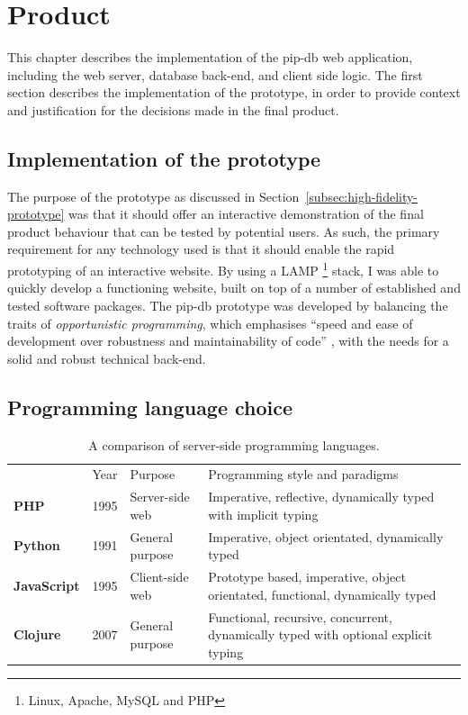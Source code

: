 \chapter{Product}\label{chap:product}
This chapter describes the implementation of the pip-db web
application, including the web server, database back-end, and client
side logic. The first section describes the implementation of the
prototype, in order to provide context and justification for the
decisions made in the final product.


\section{Implementation of the prototype}\label{sec:prototype-implementation}

The purpose of the prototype as discussed in
Section~\ref{subsec:high-fidelity-prototype} was that it should offer
an interactive demonstration of the final product behaviour that can
be tested by potential users. As such, the primary requirement for any
technology used is that it should enable the rapid prototyping of an
interactive website. By using a LAMP \footnote{Linux, Apache, MySQL
  and PHP} stack, I was able to quickly develop a functioning website,
built on top of a number of established and tested software
packages. The pip-db prototype was developed by balancing the traits
of \textit{opportunistic programming}, which emphasises ``speed and
ease of development over robustness and maintainability of code''
\cite{brandt2008opportunistic}, with the needs for a solid and robust
technical back-end.

\section{Programming language choice}\label{sec:programming-language-choice}

\cite{gabriel1991rise}

\begin{table}[H]
\centering
\begin{tabular}{l c p{3cm} p{8cm}}
                      & Year & Purpose         & Programming style and paradigms\\
  \textbf{PHP}        & 1995 & Server-side web & Imperative, reflective, dynamically typed with implicit typing\\
  \textbf{Python}     & 1991 & General purpose & Imperative, object orientated, dynamically typed\\
  \textbf{JavaScript} & 1995 & Client-side web & Prototype based, imperative, object orientated, functional, dynamically typed\\
  \textbf{Clojure}    & 2007 & General purpose & Functional, recursive, concurrent, dynamically typed with optional explicit typing\\
\end{tabular}
\caption[Server-side programming language comparison]
        {A comparison of server-side programming languages.}
\label{tab:programming-languages}
\end{table}

